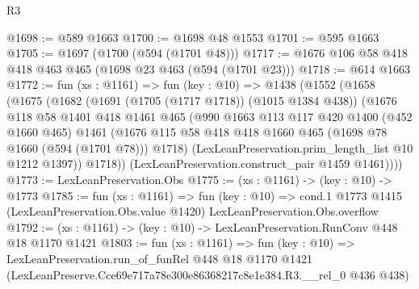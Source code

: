 \begin{lexlean}{R3}
\begin{coremodule}
@1698 := @589 @1663
@1700 := @1698 @48 @1553
@1701 := @595 @1663
@1705 := @1697 (@1700 (@594 (@1701 @48)))
@1717 := @1676 @106 @58 @418 @418 @463 @465 (@1698 @23 @463 (@594 (@1701 @23)))
@1718 := @614 @1663
@1772 := fun (xs : @1161) =>
  fun (key : @10) =>
  @1438
    (@1552
      (@1658
        (@1675
          (@1682
            (@1691 (@1705 (@1717 @1718)) (@1015 @1384 @438))
            (@1676
              @118
              @58
              @1401
              @418
              @1461
              @465
              (@990
                @1663
                @113
                @117
                @420
                @1400
                (@452 @1660 @465)
                @1461
                (@1676 @115 @58 @418 @418 @1660 @465 (@1698 @78 @1660 (@594 (@1701 @78))) @1718)
                (LexLeanPreservation.prim_length_list @10 @1212 @1397))
              @1718))
          (LexLeanPreservation.construct_pair @1459 @1461))))
@1773 := LexLeanPreservation.Obs
@1775 := (xs : @1161) -> (key : @10) -> @1773
@1785 := fun (xs : @1161) =>
  fun (key : @10) =>
  cond.{1} @1773 @1415 (LexLeanPreservation.Obs.value @1420) LexLeanPreservation.Obs.overflow
@1792 := (xs : @1161) -> (key : @10) -> LexLeanPreservation.RunConv @448 @18 @1170 @1421
@1803 := fun (xs : @1161) =>
  fun (key : @10) =>
  LexLeanPreservation.run_of_funRel
    @448
    @18
    @1170
    @1421
    (LexLeanPreserve.Cce69e717a78e300e86368217c8e1e384.R3.__rel_0 @436 @438)
\end{coremodule}
\end{lexlean}
